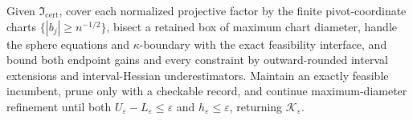 Given \(\mathfrak I_{\mathrm{cert}}\), cover each normalized projective factor by the finite pivot-coordinate charts \(\{|b_j|\ge n^{-1/2}\}\), bisect a retained box of maximum chart diameter, handle the sphere equations and \(\kappa\)-boundary with the exact feasibility interface, and bound both endpoint gains and every constraint by outward-rounded interval extensions and interval-Hessian underestimators. Maintain an exactly feasible incumbent, prune only with a checkable record, and continue maximum-diameter refinement until both \(U_{\varepsilon}-L_{\varepsilon}\le\varepsilon\) and \(h_{\varepsilon}\le\varepsilon\), returning \(\mathscr K_{\varepsilon}\).